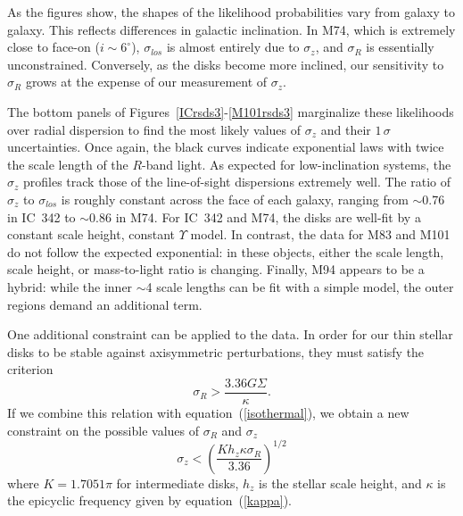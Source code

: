 \documentclass[12pt,preprint]{emulateapj}
\begin{document}
As the figures show, the shapes of the likelihood probabilities vary from galaxy to galaxy.  This reflects differences in galactic inclination.  In M74, which is extremely close to face-on ($i \sim 6^{\circ}$), $\sigma_{los}$ is almost entirely due to $\sigma_z$, and $\sigma_R$ is essentially unconstrained.  Conversely, as the disks become more inclined, our sensitivity to $\sigma_R$ grows at the expense of our measurement of $\sigma_z$.

The bottom panels of Figures~\ref{ICrsds3}-\ref{M101rsds3} marginalize these likelihoods over radial dispersion to find the most likely values of $\sigma_z$ and their $1\,\sigma$ uncertainties.  Once again, the black curves indicate exponential laws with twice the scale length of the $R$-band light. As expected for low-inclination systems, the $\sigma_z$ profiles track those of the line-of-sight dispersions extremely well.   The ratio of $\sigma_z$ to $\sigma_{los}$ is roughly constant across the face of each galaxy, ranging from $\sim$0.76 in IC~342 to $\sim$0.86 in M74.  For IC~342 and M74, the disks are well-fit by a constant scale height, constant $\Upsilon$ model.  In contrast, the data for M83 and M101 do not follow the expected exponential:  in these objects, either the scale length, scale height, or mass-to-light ratio is changing.  Finally, M94 appears to be a hybrid: while the inner $\sim$4 scale lengths can be fit with a simple model, the outer regions demand an additional term.

One additional constraint can be applied to the data.  In order for our thin stellar disks to be stable against axisymmetric perturbations, they must satisfy the \citet{t64} criterion
\begin{equation}
\sigma_R > \frac{3.36 G \Sigma}{\kappa}.
\label{Toomre}
\end{equation}
If we combine this relation with equation~(\ref{isothermal}), we obtain a new constraint on the possible values of $\sigma_R$ and $\sigma_z$
\begin{equation}
\sigma_z < \left( \frac{K h_z \kappa \sigma_R}{3.36} \right)^{1/2} \label{ToomStab}
\end{equation}
where $K = 1.7051\pi$ for intermediate disks, $h_z$ is the stellar scale height, and $\kappa$ is the epicyclic frequency given by equation~(\ref{kappa}). 
\end{document}
